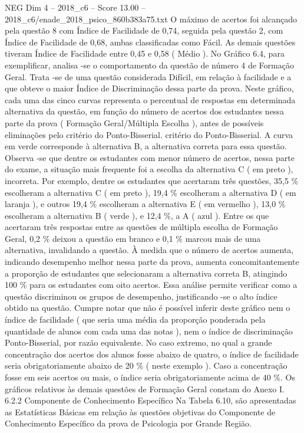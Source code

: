 \begin{textsample}{NEG Dim 4 – 2018\_c6 – Score 13.00 – 2018\_c6/enade\_2018\_psico\_860b383a75.txt}
O máximo de acertos foi alcançado pela questão 8 com Índice de Facilidade de 0,74, seguida pela questão 2, com Índice de Facilidade de 0,68, ambas classificadas como Fácil.
As demais questões tiveram Índice de Facilidade entre 0,45 e 0,58 ( Médio ).
No Gráfico 6.4, para exemplificar, analisa -se o comportamento da questão de número 4 de Formação Geral.
Trata -se de uma questão considerada Difícil, em relação à facilidade e a que obteve o maior Índice de Discriminação dessa parte da prova.
Neste gráfico, cada uma das cinco curvas representa o percentual de respostas em determinada alternativa da questão, em função do número de acertos dos estudantes nessa parte da prova ( Formação Geral/Múltipla Escolha ), antes de possíveis eliminações pelo critério do Ponto-Bisserial. critério do Ponto-Bisserial.
A curva em verde corresponde à alternativa B, a alternativa correta para essa questão.
Observa -se que dentre os estudantes com menor número de acertos, nessa parte do exame, a situação mais frequente foi a escolha da alternativa C ( em preto ), incorreta.
Por exemplo, dentre os estudantes que acertaram três questões, 35,5 \% escolheram a alternativa C ( em preto ), 19,4 \% escolheram a alternativa D ( em laranja ), e outros 19,4 \% escolheram a alternativa E ( em vermelho ), 13,0 \% escolheram a alternativa B ( verde ), e 12,4 \%, a A ( azul ).
Entre os que acertaram três respostas entre as questões de múltipla escolha de Formação Geral, 0,2 \% deixou a questão em branco e 0,1 \% marcou mais de uma alternativa, invalidando a questão.
À medida que o número de acertos aumenta, indicando desempenho melhor nessa parte da prova, aumenta concomitantemente a proporção de estudantes que selecionaram a alternativa correta B, atingindo 100 \% para os estudantes com oito acertos.
Essa análise permite verificar como a questão discriminou os grupos de desempenho, justificando -se o alto índice obtido na questão.
Cumpre notar que não é possível inferir deste gráfico nem o índice de facilidade ( que seria uma média da proporção ponderada pela quantidade de alunos com cada uma das notas ), nem o índice de discriminação Ponto-Bisserial, por razão equivalente.
No caso extremo, no qual a grande concentração dos acertos dos alunos fosse abaixo de quatro, o índice de facilidade seria obrigatoriamente abaixo de 20 \% ( neste exemplo ).
Caso a concentração fosse em seis acertos ou mais, o índice seria obrigatoriamente acima de 40 \%.
Os gráficos relativos às demais questões de Formação Geral constam do Anexo I. 6.2.2 Componente de Conhecimento Específico Na Tabela 6.10, são apresentadas as Estatísticas Básicas em relação às questões objetivas do Componente de Conhecimento Específico da prova de Psicologia por Grande Região.

\end{textsample}
